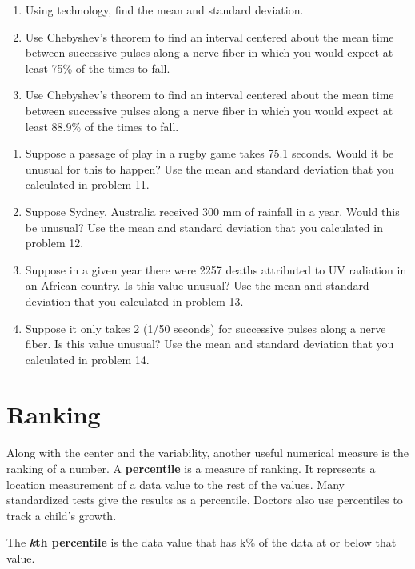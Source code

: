 \documentclass[]{book}
\begin{document}
\begin{enumerate}
\def\labelenumi{\alph{enumi}.}
\item
  Using technology, find the mean and standard deviation.
\item
  Use Chebyshev's theorem to find an interval centered about the mean
  time between successive pulses along a nerve fiber in which you
  would expect at least 75\% of the times to fall.
\item
  Use Chebyshev's theorem to find an interval centered about the mean
  time between successive pulses along a nerve fiber in which you
  would expect at least 88.9\% of the times to fall.
\end{enumerate}

\begin{enumerate}
\def\labelenumi{\arabic{enumi}.}
\setcounter{enumi}{14}
\item
  Suppose a passage of play in a rugby game takes 75.1 seconds. Would
  it be unusual for this to happen? Use the mean and standard
  deviation that you calculated in problem 11.
\item
  Suppose Sydney, Australia received 300 mm of rainfall in a year.
  Would this be unusual? Use the mean and standard deviation that you
  calculated in problem 12.
\item
  Suppose in a given year there were 2257 deaths attributed to UV
  radiation in an African country. Is this value unusual? Use the mean
  and standard deviation that you calculated in problem 13.
\item
  Suppose it only takes 2 (1/50 seconds) for successive pulses along a
  nerve fiber. Is this value unusual? Use the mean and standard
  deviation that you calculated in problem 14.
\end{enumerate}

\hypertarget{ranking}{%
\section{Ranking}\label{ranking}}

Along with the center and the variability, another useful numerical
measure is the ranking of a number. A \textbf{percentile} is a measure of
ranking. It represents a location measurement of a data value to the
rest of the values. Many standardized tests give the results as a
percentile. Doctors also use percentiles to track a child's growth.

The \textbf{\emph{k}th percentile} is the data value that has k\% of the data at or
below that value.
\end{document}
